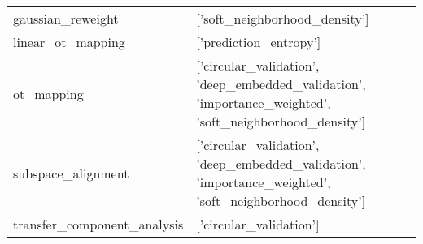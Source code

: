 \begin{tabular}{ll}
 gaussian\_reweight            & ['soft\_neighborhood\_density']                                                                                                 \\
 linear\_ot\_mapping            & ['prediction\_entropy']                                                                                                        \\
 ot\_mapping                   & ['circular\_validation', 'deep\_embedded\_validation', 'importance\_weighted', 'soft\_neighborhood\_density']                       \\
 subspace\_alignment           & ['circular\_validation', 'deep\_embedded\_validation', 'importance\_weighted', 'soft\_neighborhood\_density']                       \\
 transfer\_component\_analysis  & ['circular\_validation']                                                                                                       \\
\hline
\end{tabular}
